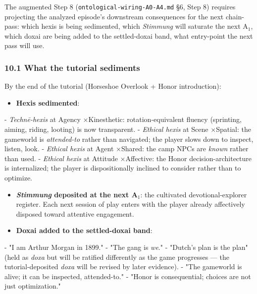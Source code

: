 \documentclass[11pt]{report}
\begin{document}
The augmented Step 8 (\texttt{ontological-\discretionary{}{}{}wiring-\discretionary{}{}{}A0-\discretionary{}{}{}A4.\discretionary{}{}{}md} §6, Step 8) requires projecting the analyzed episode's downstream consequences for the next chain-pass: which hexis is being sedimented, which \textit{Stimmung} will saturate the next A$_1$, which doxai are being added to the settled-doxai band, what entry-point the next pass will use.


\subsubsection{10.1 What the tutorial sediments}


By the end of the tutorial (Horseshoe Overlook + Honor introduction):


\begin{itemize}
\item \textbf{Hexis sedimented}:
\end{itemize}

- \textit{Technē-hexis} at Agency $\times$\allowbreak  Kinesthetic: rotation-equivalent fluency (sprinting, aiming, riding, looting) is now transparent. - \textit{Ethical hexis} at Scene $\times$\allowbreak  Spatial: the gameworld is \textit{attended-to} rather than navigated; the player slows down to inspect, listen, look. - \textit{Ethical hexis} at Agent $\times$\allowbreak  Shared: the camp NPCs are \textit{known} rather than used. - \textit{Ethical hexis} at Attitude $\times$\allowbreak  Affective: the Honor decision-architecture is internalized; the player is dispositionally inclined to consider rather than to optimize.

\begin{itemize}
\item \textbf{\textit{Stimmung} deposited at the next A$_1$}: the cultivated devotional-explorer register. Each next session of play enters with the player already affectively disposed toward attentive engagement.
\item \textbf{Doxai added to the settled-doxai band}:
\end{itemize}

- "I am Arthur Morgan in 1899." - "The gang is \textit{we}." - "Dutch's plan is the plan" (held as \textit{doxa} but will be ratified differently as the game progresses — the tutorial-deposited \textit{doxa} will be revised by later evidence). - "The gameworld is alive; it can be inspected, attended-to." - "Honor is consequential; choices are not just optimization."
\end{document}
